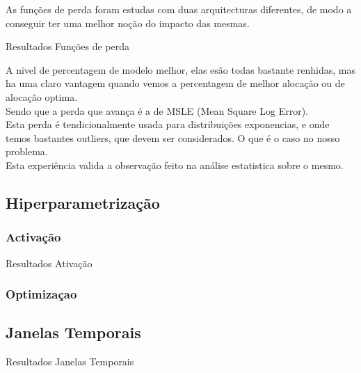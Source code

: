 As funções de perda foram estudas com duas arquitecturas diferentes, de modo a conseguir ter uma melhor noção do impacto das mesmas.

\begin{table}[H]
\caption{Resultados Funções de perda}        
\resizebox{\linewidth}{!}{}
\end{table}

A nivel de percentagem de modelo melhor, elas esão todas bastante renhidas, mas ha uma claro vantagem quando vemos a percentagem de melhor alocação ou de alocação optima.\\
Sendo que a perda que avança é a de MSLE (Mean Square Log Error).\\
Esta perda é tendicionalmente usada para distribuições exponencias, e onde temos bastantes outliers, que devem ser considerados. O que é o caso no nosso problema.\\
Esta experiência valida a observação feito na análise estatistica sobre o mesmo.\\

\subsection{Hiperparametrização\label{se:hiper}}

\subsubsection{Activação\label{se:activ}}

\begin{table}[H]
\caption{Resultados Ativação}    
\resizebox{\linewidth}{!}{}
\end{table}

\subsubsection{Optimizaçao\label{se:opt}}


\subsection{Janelas Temporais}

\begin{table}[H]
\caption{Resultados Janelas Temporais}
\resizebox{\linewidth}{!}{}        
\end{table}

